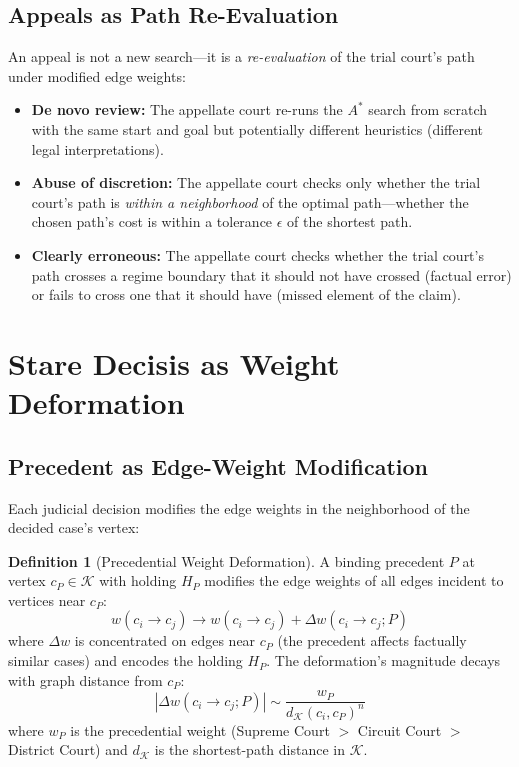 \documentclass[12pt]{article}
\theoremstyle{definition}
\newtheorem{definition}[theorem]{Definition}
\theoremstyle{remark}
\begin{document}
\subsection{Appeals as Path Re-Evaluation}

An appeal is not a new search---it is a \emph{re-evaluation} of the trial court's path under modified edge weights:

\begin{itemize}
    \item \textbf{De novo review:} The appellate court re-runs the $A^*$ search from scratch with the same start and goal but potentially different heuristics (different legal interpretations).
    \item \textbf{Abuse of discretion:} The appellate court checks only whether the trial court's path is \emph{within a neighborhood} of the optimal path---whether the chosen path's cost is within a tolerance $\epsilon$ of the shortest path.
    \item \textbf{Clearly erroneous:} The appellate court checks whether the trial court's path crosses a regime boundary that it should not have crossed (factual error) or fails to cross one that it should have (missed element of the claim).
\end{itemize}


\section{Stare Decisis as Weight Deformation}
\label{sec:curvature}

\subsection{Precedent as Edge-Weight Modification}

Each judicial decision modifies the edge weights in the neighborhood of the decided case's vertex:

\begin{definition}[Precedential Weight Deformation]
A binding precedent $P$ at vertex $c_P \in \mathcal{K}$ with holding $H_P$ modifies the edge weights of all edges incident to vertices near $c_P$:
\begin{equation}
w(c_i \to c_j) \to w(c_i \to c_j) + \Delta w(c_i \to c_j; P)
\label{eq:precedent}
\end{equation}
where $\Delta w$ is concentrated on edges near $c_P$ (the precedent affects factually similar cases) and encodes the holding $H_P$.  The deformation's magnitude decays with graph distance from $c_P$:
\begin{equation}
|\Delta w(c_i \to c_j; P)| \sim \frac{w_P}{d_{\mathcal{K}}(c_i, c_P)^n}
\label{eq:decay}
\end{equation}
where $w_P$ is the precedential weight (Supreme Court $>$ Circuit Court $>$ District Court) and $d_{\mathcal{K}}$ is the shortest-path distance in $\mathcal{K}$.
\end{definition}
\end{document}
